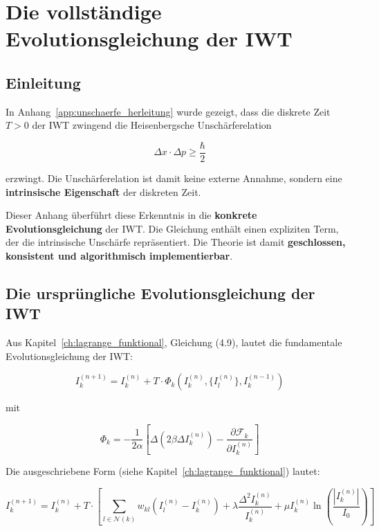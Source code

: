 
\chapter{Die vollständige Evolutionsgleichung der IWT}
\label{app:iwt_evolutionsgleichung}

\section{Einleitung}
\label{app:iwt_eq_einleitung}

In Anhang~\ref{app:unschaerfe_herleitung} wurde gezeigt, dass die diskrete Zeit \( T > 0 \) der IWT zwingend die Heisenbergsche Unschärferelation

\[
\Delta x \cdot \Delta p \ge \frac{\hbar}{2}
\]

erzwingt. Die Unschärferelation ist damit keine externe Annahme, sondern eine \textbf{intrinsische Eigenschaft} der diskreten Zeit.

Dieser Anhang überführt diese Erkenntnis in die \textbf{konkrete Evolutionsgleichung} der IWT. Die Gleichung enthält einen expliziten Term, der die intrinsische Unschärfe repräsentiert. Die Theorie ist damit \textbf{geschlossen, konsistent und algorithmisch implementierbar}.

\section{Die ursprüngliche Evolutionsgleichung der IWT}
\label{app:iwt_eq_ursprung}

Aus Kapitel~\ref{ch:lagrange_funktional}, Gleichung (4.9), lautet die fundamentale Evolutionsgleichung der IWT:

\[
I_k^{(n+1)} = I_k^{(n)} + T \cdot \Phi_k\left(I_k^{(n)}, \{I_l^{(n)}\}, I_k^{(n-1)}\right)
\]

mit

\[
\Phi_k = -\frac{1}{2\alpha} \left[ \Delta \left( 2\beta \Delta I_k^{(n)} \right) - \frac{\partial \mathcal{F}_k}{\partial I_k^{(n)}} \right]
\]

Die ausgeschriebene Form (siehe Kapitel~\ref{ch:lagrange_funktional}) lautet:

\[
I_k^{(n+1)} = I_k^{(n)} + T \cdot \left[
\sum_{l \in \mathcal{N}(k)} w_{kl} (I_l^{(n)} - I_k^{(n)})
+ \lambda \frac{\Delta^2 I_k^{(n)}}{I_k^{(n)}}
+ \mu I_k^{(n)} \ln\left(\frac{|I_k^{(n)}|}{I_0}\right)
\right]
\tag{P.1}
\]

